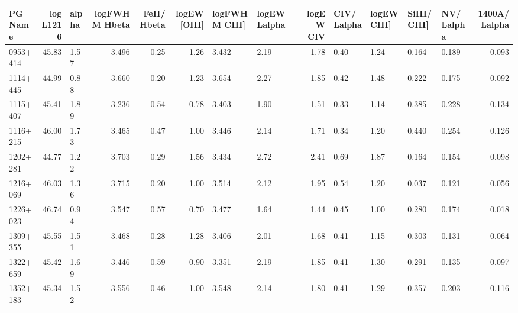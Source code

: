 \begin{tabular}{lrlrrrllrllllr}
\toprule
  PG Name &  log L1216 & alpha &  logFWHM Hbeta  &  FeII/ Hbeta  &  logEW [OIII] & logFWHM CIII] & logEW Lalpha &  logEW CIV & CIV/ Lalpha & logEW CIII] & SiIII/ CIII] & NV/ Lalpha &  1400A/ Lalpha \\
\midrule
 0953+414 &      45.83 &  1.57 &           3.496 &          0.25 &          1.26 &         3.432 &         2.19 &       1.78 &        0.40 &        1.24 &        0.164 &      0.189 &          0.093 \\
 1114+445 &      44.99 &  0.88 &           3.660 &          0.20 &          1.23 &         3.654 &         2.27 &       1.85 &        0.42 &        1.48 &        0.222 &      0.175 &          0.092 \\
 1115+407 &      45.41 &  1.89 &           3.236 &          0.54 &          0.78 &         3.403 &         1.90 &       1.51 &        0.33 &        1.14 &        0.385 &      0.228 &          0.134 \\
 1116+215 &      46.00 &  1.73 &           3.465 &          0.47 &          1.00 &         3.446 &         2.14 &       1.71 &        0.34 &        1.20 &        0.440 &      0.254 &          0.126 \\
 1202+281 &      44.77 &  1.22 &           3.703 &          0.29 &          1.56 &         3.434 &         2.72 &       2.41 &        0.69 &        1.87 &        0.164 &      0.154 &          0.098 \\
 1216+069 &      46.03 &  1.36 &           3.715 &          0.20 &          1.00 &         3.514 &         2.12 &       1.95 &        0.54 &        1.20 &        0.037 &      0.121 &          0.056 \\
 1226+023 &      46.74 &  0.94 &           3.547 &          0.57 &          0.70 &         3.477 &         1.64 &       1.44 &        0.45 &        1.00 &        0.280 &      0.174 &          0.018 \\
 1309+355 &      45.55 &  1.51 &           3.468 &          0.28 &          1.28 &         3.406 &         2.01 &       1.68 &        0.41 &        1.15 &        0.303 &      0.131 &          0.064 \\
 1322+659 &      45.42 &  1.69 &           3.446 &          0.59 &          0.90 &         3.351 &         2.19 &       1.85 &        0.41 &        1.30 &        0.291 &      0.135 &          0.097 \\
 1352+183 &      45.34 &  1.52 &           3.556 &          0.46 &          1.00 &         3.548 &         2.14 &       1.80 &        0.41 &        1.29 &        0.357 &      0.203 &          0.116 \\

\end{tabular}

